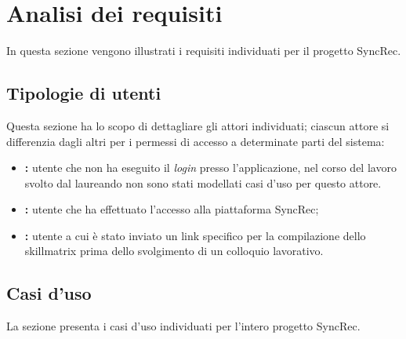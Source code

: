 
\chapter{Analisi dei requisiti}
\label{cap:descrizione-stage}
In questa sezione vengono illustrati i requisiti individuati per il progetto SyncRec.

\section{Tipologie di utenti}
Questa sezione ha lo scopo di dettagliare gli attori individuati; ciascun attore si differenzia dagli altri per i permessi di accesso a determinate parti del sistema:
\begin{itemize}	
	\item \textbf{\nonlogged:} utente che non ha eseguito il \textit{login} presso l'applicazione, nel corso del lavoro svolto dal laureando non sono stati modellati casi d'uso per questo attore.
	\item \textbf{\loggedusr:} utente che ha effettuato l'accesso alla piattaforma SyncRec;
	\item \textbf{\applicant:} utente a cui è stato inviato un link specifico per la compilazione dello skillmatrix prima dello svolgimento di un colloquio lavorativo. 
\end{itemize}

\section{Casi d'uso}
La sezione presenta i casi d'uso individuati per l'intero progetto SyncRec.

